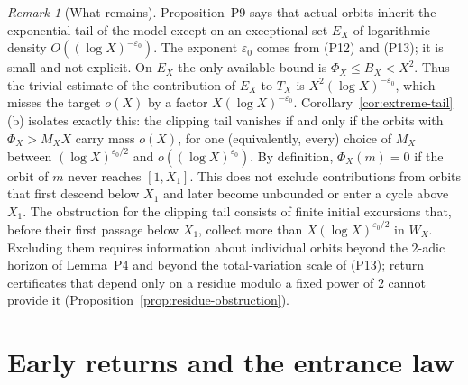 \documentclass[11pt]{article}
\theoremstyle{remark}
\newtheorem{remark}[theorem]{Remark}
\begin{document}
\begin{remark}[What remains]
\label{rem:tail-barrier}
Proposition~P9 says that actual orbits inherit the
exponential tail of the model except on an exceptional set $E_X$ of
logarithmic density $O((\log X)^{-\varepsilon_0})$. The exponent
$\varepsilon_0$ comes from (P12) and (P13); it
is small and not explicit. On $E_X$ the only available bound is
$\Phi_X\le B_X<X^2$. Thus the trivial estimate of the contribution of
$E_X$ to $T_X$ is $X^2(\log X)^{-\varepsilon_0}$, which misses the
target $o(X)$ by a factor $X(\log X)^{-\varepsilon_0}$.
Corollary~\ref{cor:extreme-tail}(b) isolates exactly this: the clipping
tail vanishes if and only if the orbits with $\Phi_X>M_XX$ carry mass
$o(X)$, for one (equivalently, every) choice of $M_X$ between
$(\log X)^{\varepsilon_0/2}$ and $o((\log X)^{\varepsilon_0})$.
By definition, $\Phi_X(m)=0$ if the orbit of $m$ never reaches
$[1,X_1]$. This does not exclude contributions from orbits that
first descend below $X_1$ and later become unbounded or enter a
cycle above $X_1$. The obstruction for the clipping tail consists of
finite initial excursions that, before their first passage below $X_1$,
collect more than $X(\log X)^{\varepsilon_0/2}$ in $W_X$.
Excluding them requires information about individual orbits beyond the
$2$-adic horizon of Lemma~P4 and beyond the
total-variation scale of (P13); return certificates that
depend only on a residue modulo a fixed power of $2$ cannot provide it
(Proposition~\ref{prop:residue-obstruction}).
\end{remark}

\section{Early returns and the entrance law}
\end{document}
